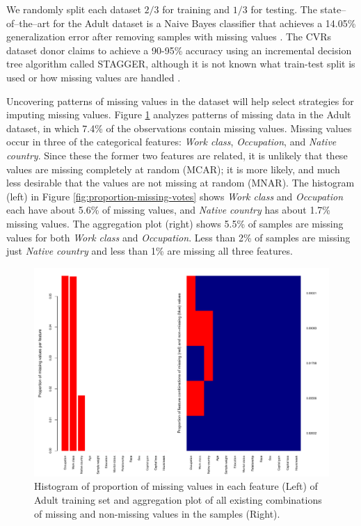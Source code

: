 \documentclass[10pt]{book}
\theoremstyle{definition}
\begin{document}
We randomly split each dataset $2/3$ for training and $1/3$ for testing. The state--of--the--art for the Adult dataset is a Naive Bayes classifier that achieves a 14.05\% generalization error after removing samples with missing values \citep{kohavi1996}. The CVRs dataset donor claims to achieve a 90-95\% accuracy using an incremental decision tree algorithm called STAGGER, although it is not known what train-test split is used or how missing values are handled \citep{schlimmer1987,schlimmer1986}.

\par
{}

Uncovering patterns of missing values in the dataset will help select strategies for imputing missing values. Figure \ref{fig:proportion-missing-adult} analyzes patterns of missing data in the Adult dataset, in which 7.4\% of the observations contain missing values. Missing values occur in three of the categorical features: \textit{Work class}, \textit{Occupation}, and \textit{Native country}. Since these the former two features are related, it is unlikely that these values are missing completely at random (MCAR); it is more likely, and much less desirable that the values are not missing at random (MNAR). The histogram (left) in Figure \ref{fig:proportion-missing-votes} shows \textit{Work class} and \textit{Occupation} each have about 5.6\% of missing values, and \textit{Native country} has about 1.7\% missing values. The aggregation plot (right) shows 5.5\% of samples are missing values for both \textit{Work class} and \textit{Occupation}. Less than 2\% of samples are missing just \textit{Native country} and less than 1\% are missing all three features.

\begin{figure}[h!]
\includegraphics [scale=0.45]{figure/proportion-missing-adult.pdf}\par
\caption{\footnotesize Histogram of proportion of missing values in each feature (Left) of Adult training set and aggregation plot of all existing combinations of missing and non-missing values in the samples (Right).}
 \label{fig:proportion-missing-adult}
\end{figure}
\end{document}
